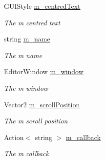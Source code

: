 \begin{DoxyCompactItemize}
G\+U\+I\+Style \hyperlink{class_lerp2_a_p_i_editor_1_1_utility_1_1_file_browser_editor_ac805ca3a07179e639c7d64cca248c330}{m\+\_\+centred\+Text}
\begin{DoxyCompactList}\small\item\em The m centred text \end{DoxyCompactList}\item 
string \hyperlink{class_lerp2_a_p_i_editor_1_1_utility_1_1_file_browser_editor_a1896ff88f56524f544971c05e8002001}{m\+\_\+name}
\begin{DoxyCompactList}\small\item\em The m name \end{DoxyCompactList}\item 
Editor\+Window \hyperlink{class_lerp2_a_p_i_editor_1_1_utility_1_1_file_browser_editor_a5174e50ca24cab7adee6a6eb5602a0cf}{m\+\_\+window}
\begin{DoxyCompactList}\small\item\em The m window \end{DoxyCompactList}\item 
Vector2 \hyperlink{class_lerp2_a_p_i_editor_1_1_utility_1_1_file_browser_editor_a4a4bf3bd81cc8a63433c4756a3d3a4d6}{m\+\_\+scroll\+Position}
\begin{DoxyCompactList}\small\item\em The m scroll position \end{DoxyCompactList}\item 
Action$<$ string $>$ \hyperlink{class_lerp2_a_p_i_editor_1_1_utility_1_1_file_browser_editor_a2ded1ad1067ba05375edec5ec85c82a4}{m\+\_\+callback}
\begin{DoxyCompactList}\small\item\em The m callback \end{DoxyCompactList}\end{DoxyCompactItemize}
